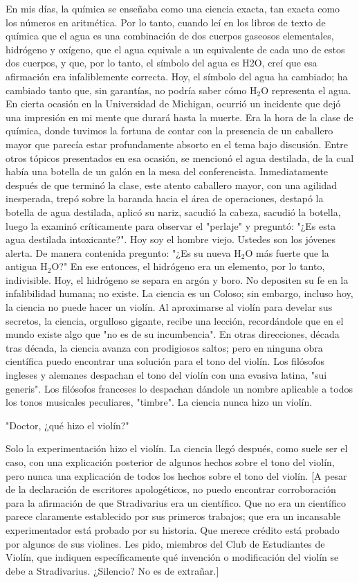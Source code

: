 \documentclass[12pt]{book}
\begin{document}
En mis días, la química se enseñaba como una ciencia exacta, tan exacta como los números en aritmética. Por lo tanto, cuando leí en los libros de texto de química que el agua es una combinación de dos cuerpos gaseosos elementales, hidrógeno y oxígeno, que el agua equivale a un equivalente de cada uno de estos dos cuerpos, y que, por lo tanto, el símbolo del agua es H2O, creí que esa afirmación era infaliblemente correcta. Hoy, el símbolo del agua ha cambiado; ha cambiado tanto que, sin garantías, no podría saber cómo \( \text{H}_2 \text{O} \) representa el agua.
En cierta ocasión en la Universidad de Michigan, ocurrió un incidente que dejó una impresión en mi mente que durará hasta la muerte. Era la hora de la clase de química, donde tuvimos la fortuna de contar con la presencia de un caballero mayor que parecía estar profundamente absorto en el tema bajo discusión. Entre otros tópicos presentados en esa ocasión, se mencionó el agua destilada, de la cual había una botella de un galón en la mesa del conferencista. Inmediatamente después de que terminó la clase, este atento caballero mayor, con una agilidad inesperada, trepó sobre la baranda hacia el área de operaciones, destapó la botella de agua destilada, aplicó su nariz, sacudió la cabeza, sacudió la botella, luego la examinó críticamente para observar el "perlaje" y preguntó: "¿Es esta agua destilada intoxicante?". Hoy soy el hombre viejo. Ustedes son los jóvenes alerta.
De manera contenida pregunto: "¿Es su nueva \( \text{H}_2\text{O} \) más fuerte que la antigua \( \text{H}_2 \text{O} \)?"
En ese entonces, el hidrógeno era un elemento, por lo tanto, indivisible. Hoy, el hidrógeno se separa en argón y boro. No depositen su fe en la infalibilidad humana; no existe. La ciencia es un Coloso; sin embargo, incluso hoy, la ciencia no puede hacer un violín. Al aproximarse al violín para develar sus secretos, la ciencia, orgulloso gigante, recibe una lección, recordándole que en el mundo existe algo que "no es de su incumbencia".
En otras direcciones, década tras década, la ciencia avanza con prodigiosos saltos; pero en ninguna obra científica puedo encontrar una solución para el tono del violín.
Los filósofos ingleses y alemanes despachan el tono del violín con una evasiva latina, "sui generis". Los filósofos franceses lo despachan dándole un nombre aplicable a todos los tonos musicales peculiares, "timbre".
La ciencia nunca hizo un violín.

"Doctor, ¿qué hizo el violín?"

Solo la experimentación hizo el violín. La ciencia llegó después, como suele ser el caso, con una explicación posterior de algunos hechos sobre el tono del violín, pero nunca una explicación de todos los hechos sobre el tono del violín.
[A pesar de la declaración de escritores apologéticos, no puedo encontrar corroboración para la afirmación de que Stradivarius era un científico. Que no era un científico parece claramente establecido por sus primeros trabajos; que era un incansable experimentador está probado por su historia. Que merece crédito está probado por algunos de sus violines. Les pido, miembros del Club de Estudiantes de Violín, que indiquen específicamente qué invención o modificación del violín se debe a Stradivarius.
¿Silencio?
No es de extrañar.]
\end{document}
